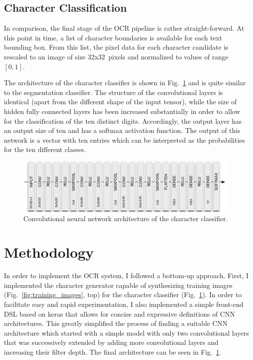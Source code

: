\documentclass[11pt]{article}
\newcommand\figref[1]{Fig.~\ref{fig:#1}}
\begin{document}
\subsection{Character Classification}
In comparison, the final stage of the OCR pipeline is rather straight-forward. At this point
in time, a list of character boundaries is available for each text bounding box. From this list,
the pixel data for each character candidate is rescaled to an image of size 32x32~pixels and
normalized to values of range $[0,1]$.

The architecture of the character classifier is shown in \figref{classifier_cnn} and is
quite similar to the segmentation classifier. The structure of the convolutional layers is
identical (apart from the different shape of the input tensor), while the size of hidden
fully connected layers has been increased substantially in order to allow for the
classification of the ten distinct digits. Accordingly, the output layer has an output size
of ten and has a softmax activation function. The output of this network is a vector
with ten entries which can be interpreted as the probabilities for the ten different classes.

\begin{figure}[ht]
  \centering
  \includegraphics[scale=0.75]{fig/Classifier_CNN}
  \caption
  {
    Convolutional neural network architecture of the character classifier.
  }
  \label{fig:classifier_cnn}
\end{figure}


\section{Methodology}
In order to implement the OCR system, I followed a bottom-up approach. First, I implemented
the character generator capable of synthesizing training images (\figref{training_images}, top)
for the character classifier (\figref{classifier_cnn}). In order to facilitate easy and rapid
experimentation, I also implemented a simple front-end DSL based on keras \cite{KerasDoc40:online} that allows
for concise and expressive definitions of CNN architectures. This greatly simplified the
process of finding a suitable CNN architecture which started with a simple model with only
two convolutional layers that was successively extended by adding more convolutional layers
and increasing their filter depth. The final architecture can be seen in \figref{classifier_cnn}.
\end{document}
